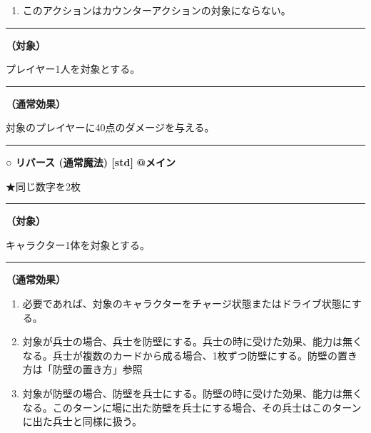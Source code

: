 \documentclass[twocolumn,a5paper,papersize,10pt]{jarticle}
\begin{document}
\vspace{-1zh}%
\begin{enumerate}
\renewcommand{\labelenumi}{※}
\setlength{\leftskip}{-0.3cm}
\setlength{\itemsep}{0pt} %
\setlength{\parskip}{0pt} %

\item このアクションはカウンターアクションの対象にならない。

\vspace{-3mm}%
\end{enumerate}
\vspace{1mm}%
\hrule height 0.1mm depth 0mm width 66.5mm %
\vspace{1mm}%
{\bf（対象）}

プレイヤー1人を対象とする。
\vspace{1mm}%
\hrule height 0.1mm depth 0mm width 66.5mm %
\vspace{1mm}%

{\bf（通常効果）}

対象のプレイヤーに40点のダメージを与える。
\vspace{2mm} %
\hrule height 0.5mm depth 0mm width 66.5mm %
\vspace{1mm} %
{\normalsize\bf ○ リバース {\scriptsize (通常魔法) [std]}} %
\hfill 
{\small\bf @メイン }

★同じ数字を2枚

\vspace{1mm}%
\hrule height 0.1mm depth 0mm width 66.5mm %
\vspace{1mm}%
{\bf（対象）}

キャラクター1体を対象とする。
\vspace{1mm}%
\hrule height 0.1mm depth 0mm width 66.5mm %
\vspace{1mm}%

{\bf（通常効果）}


\vspace{-1zh}%
\begin{enumerate}
\setlength{\leftskip}{-0.3cm}
\setlength{\parskip}{0pt} %

\item 必要であれば、対象のキャラクターをチャージ状態またはドライブ状態にする。

\item 対象が兵士の場合、兵士を防壁にする。兵士の時に受けた効果、能力は無くなる。兵士が複数のカードから成る場合、1枚ずつ防壁にする。防壁の置き方は「防壁の置き方」参照

\item 対象が防壁の場合、防壁を兵士にする。防壁の時に受けた効果、能力は無くなる。このターンに場に出た防壁を兵士にする場合、その兵士はこのターンに出た兵士と同様に扱う。
\vspace{-1zh}%
\end{enumerate}
\end{document}
